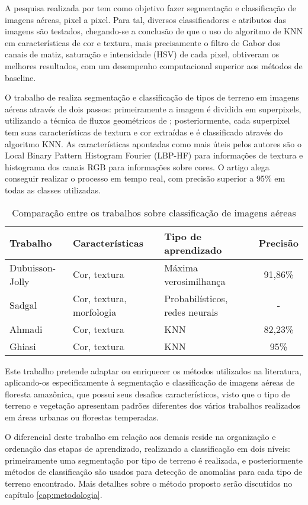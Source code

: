 A pesquisa realizada por  tem como objetivo fazer segmentação e classificação de imagens aéreas, pixel a pixel. Para tal, diversos classificadores e atributos das imagens são testados, chegando-se a conclusão de que o uso do algoritmo de KNN em características de cor e textura, mais precisamente o filtro de Gabor \cite{fogel:1989} dos canais de matiz, saturação e intensidade (HSV) de cada pixel, obtiveram os melhores resultados, com um desempenho computacional superior aos métodos de baseline.

O trabalho de  realiza segmentação e classificação de tipos de terreno em imagens aéreas através de dois passos: primeiramente a imagem é dividida em superpixels, utilizando a técnica de fluxos geométricos de ; posteriormente, cada superpixel tem suas características de textura e cor extraídas e é classificado através do algoritmo KNN. As características apontadas como mais úteis pelos autores são o Local Binary Pattern Histogram Fourier (LBP-HF) \cite{ahonen:2009} para informações de textura e histograma dos canais RGB para informações sobre cores. O artigo alega conseguir realizar o processo em tempo real, com precisão superior a 95\% em todas as classes utilizadas.

\begin{table}[h]
\begin{tabular}{|l|l|l|c|}
\hline
\textbf{Trabalho} & \textbf{Características} & \textbf{Tipo de aprendizado} & \textbf{Precisão} \\ \hline
Dubuisson-Jolly & Cor, textura & Máxima verosimilhança & 91,86\% \\ \hline
Sadgal          & Cor, textura, morfologia & Probabilísticos, redes neurais & - \\ \hline
Ahmadi          & Cor, textura & KNN & 82,23\% \\ \hline
Ghiasi          & Cor, textura & KNN & 95\% \\ \hline
\end{tabular}
\caption{Comparação entre os trabalhos sobre classificação de imagens aéreas}
\label{tab:sumarioClassificacao}
\end{table}

Este trabalho pretende adaptar ou enriquecer os métodos utilizados na literatura, aplicando-os especificamente à segmentação e classificação de imagens aéreas de floresta amazônica, que possui seus desafios característicos, visto que o tipo de terreno e vegetação apresentam padrões diferentes dos vários trabalhos realizados em áreas urbanas ou florestas temperadas.

O diferencial deste trabalho em relação aos demais reside na organização e ordenação das etapas de aprendizado, realizando a classificação em dois níveis: primeiramente uma segmentação por tipo de terreno é realizada, e posteriormente métodos de classificação são usados para detecção de anomalias para cada tipo de terreno encontrado. Mais detalhes sobre o método proposto serão discutidos no capítulo \ref{cap:metodologia}.